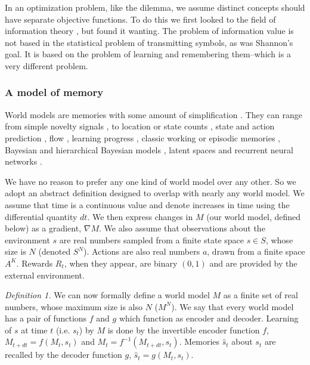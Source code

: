 \documentclass[fleqn,10pt]{wlscirep}
\begin{document}
In an optimization problem, like the dilemma, we assume distinct concepts should have separate objective functions. To do this we first looked to the field of information theory \cite{Shannon1948}, but found it wanting. The problem of information value is not based in the statistical problem of transmitting symbols, as was Shannon’s goal. It is based on the problem of learning and remembering them--which is a very different problem. 

\subsubsection*{A model of memory}
World models are memories with some amount of simplification \cite{Schmidhuber1991,Ha2018}. They can range from simple novelty signals \cite{Kakade2002}, to location or state counts \cite{Bellemare2016,Dayan1993}, state and action prediction \cite{Schmidhuber1991,Pathak2017,Friston2016}, flow \cite{Yang2019}, learning progress \cite{Lopes2012}, classic working or episodic memories \cite{Miller1956,Tulving2002}, Bayesian and hierarchical Bayesian models \cite{Park2017,Itti2009,Friston2016,Tenenbaum2006}, latent spaces \cite{Kingma2013} and recurrent neural networks \cite{Ganguli2008,Ha2018,Schmidhuber2015a,Mante2013}. 

We have no reason to prefer any one kind of world model over any other. So we adopt an abstract definition designed to overlap with nearly any world model. We assume that time is a continuous value and denote increases in time using the differential quantity $dt$. We then express changes in $M$ (our world model, defined below) as a gradient, $\nabla M$. We also assume that observations about the environment $s$ are real numbers sampled from a finite state space $s \in S$, whose size is $N$ (denoted $S^N$). Actions are also real numbers $a$, drawn from a finite space $A^K$. Rewards $R_t$, when they appear, are binary $(0,1)$ and are provided by the external environment. 

\textit{Definition 1.} We can now formally define a world model $M$ as a finite set of real numbers, whose maximum size is also $N$ ($M^N$). We say that every world model has a pair of functions $f$ and $g$ which function as encoder and decoder. Learning of $s$ at time $t$ (i.e. $s_t$) by $M$ is done by the invertible encoder function $f$, $M_{t+dt} = f(M_{t}, s_{t})$ and $M_{t} = f^{-1}(M_{t+dt}, s_{t})$. Memories $\hat s_t$ about $s_t$ are recalled by the decoder function $g$, $\hat s_t = g(M_t, s_t)$. 
\end{document}
